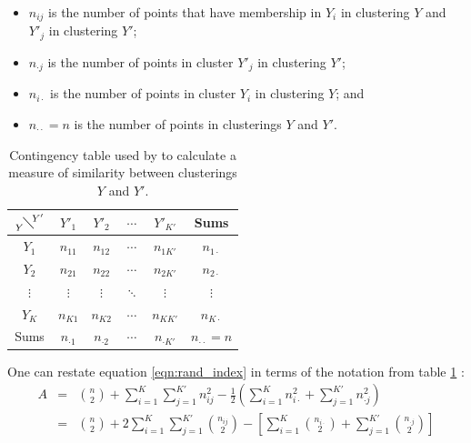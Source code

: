 \documentclass[12pt]{article} %
\begin{document}
	\begin{itemize}
		\item $n_{ij}$ is the number of points that have membership in $Y_i$ in clustering $Y$ and $Y'_j$ in clustering $Y'$;
		\item $n_{\cdot j}$ is the number of points in cluster $Y'_j$ in clustering $Y'$;
		\item $n_{i \cdot}$ is the number of points in cluster $Y_i$ in clustering $Y$; and
		\item $n_{\cdot \cdot} = n$ is the number of points in clusterings $Y$ and $Y'$.
	\end{itemize}
	\begin{table}[] 
		\centering
		\begin{tabular}{c|cccc|c} 
			$ {{} \atop Y}  \!\diagdown\! ^{Y'}$	& $Y'_1$	& $Y'_2$	& $\cdots$	& $Y'_{K'}$	& Sums	\\ 
			\hline
			$Y_1$		& $n_{11}$	& $n_{12}$	& $\cdots$	& $n_{1K'}$	& $n_{1 \cdot}$	\\
			$Y_2$		& $n_{21}$	& $n_{22}$	& $\cdots$	& $n_{2K'}$	& $n_{2 \cdot}$	\\
			$\vdots$	& $\vdots$	& $\vdots$	& $\ddots$	& $\vdots$	& $\vdots$		 \\
			$Y_{K}$	& $n_{K1}$	& $n_{K2}$	& $\cdots$	& $n_{KK'}$	& $n_{K \cdot}$	\\ 
			\hline
			Sums	& $n_{\cdot 1}$	&  $n_{\cdot 2}$	& $\cdots$	& $n_{\cdot K'}$	& $n_{\cdot \cdot} = n$         
		\end{tabular}
		\caption{Contingency table used by \citet{RandObjectiveCriteriaEvaluation1971} to calculate a measure of similarity between clusterings $Y$ and $Y'$.}
		\label{table:rand_contingency}
	\end{table}
	One can restate equation \ref{eqn:rand_index} in terms of the notation from table \ref{table:rand_contingency} \citep{BrennanMeasuringagreementwhen1974}:
	\begin{eqnarray} \label{eqn:rand_index_alternative}
	A &=& \binom{n}{2} + \sum_{i=1}^K\sum_{j=1}^{K'}n_{ij}^2 - \frac{1}{2}\left(\sum_{i=1}^K n_{i\cdot}^2 + \sum_{j=1}^{K'}n_{\cdot j}^2  \right) \\
	&=& \binom{n}{2} + 2 \sum_{i=1}^{K}\sum_{j=1}^{K'}\binom{n_{ij}}{2} - \left[\sum_{i=1}^{K}\binom{n_{i \cdot}}{2} + \sum_{j=1}^{K'}\binom{n_{\cdot j}}{2}\right]%
	\end{eqnarray}
\end{document}
